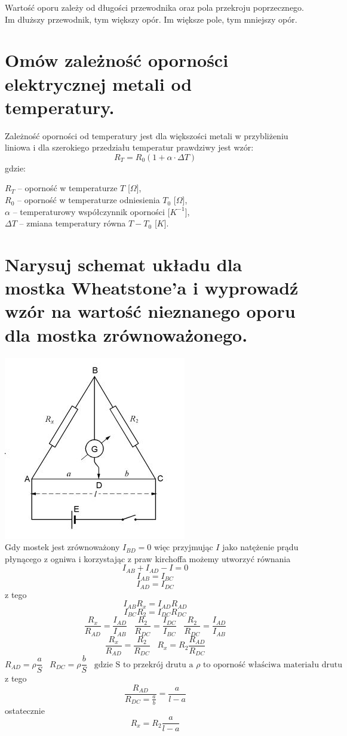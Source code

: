 \documentclass[a4paper,11pt]{article} %
\begin{document}
Wartość oporu zależy od długości przewodnika oraz pola przekroju poprzecznego. Im dłuższy przewodnik, tym większy opór. Im większe pole, tym mniejszy opór.

\section{Omów zależność oporności elektrycznej metali od temperatury. 
}
Zależność oporności od temperatury jest dla większości metali w przybliżeniu liniowa i dla szerokiego przedziału temperatur prawdziwy jest wzór:
$$ R_T = R_0(1+\alpha \cdot \Delta T)$$
gdzie:

$R_{T}$  – oporność w temperaturze $T$  [$\Omega$],\\
$R_{0}$  – oporność w temperaturze odniesienia $T_{0}$  [$\Omega$],\\
$\alpha$  – temperaturowy współczynnik oporności [$K^{-1}$],\\
$\Delta T$  – zmiana temperatury równa $T-T_{0}$  [$K$].

\section{Narysuj schemat układu dla mostka Wheatstone’a i wyprowadź wzór na
wartość nieznanego oporu dla mostka zrównoważonego.}
\includegraphics[scale=1]{mostek.jpg}
\\
Gdy mostek jest zrównoważony $I_{BD} = 0$ więc przyjmując $I$ jako natężenie prądu płynącego z ogniwa i korzystając z praw kirchoffa możemy utworzyć równania
$$I_{AB} + I_{AD} - I = 0$$
$$I_{AB} = I_{BC} $$
$$ I_{AD} = I_{DC} $$
z tego 
$$I_{AB}R_x = I_{AD}R_{AD}$$
$$I_{BC}R_2 = I_{DC}R_{DC}$$
$$\frac{R_x}{R_{AD}} = \frac{I_{AD}}{I_{AB}} \hspace{10pt} \frac{R_2}{R_{DC}} = \frac{I_{DC}}{I_{BC}} \hspace{10pt} \frac{R_2}{R_{DC}} = \frac{I_{AD}}{I_{AB}}$$
$$\frac{R_x}{R_{AD}} = \frac{R_2}{R_{DC}} \hspace{10pt} R_x = R_2 \frac{R_{AD}}{R_{DC}}$$
$$R_{AD} = \rho \frac{a}{S} \hspace{10pt} R_{DC} = \rho \frac{b}{S} \hspace{10pt}\text{gdzie S to przekrój drutu a } \rho \text{ to oporność właściwa materiału drutu}$$
z tego
$$ \frac{R_{AD}}{R_{DC} = \frac{a}{b}} = \frac{a}{l-a}$$
ostatecznie
$$R_x = R_2\frac{a}{l-a}$$
\end{document}
